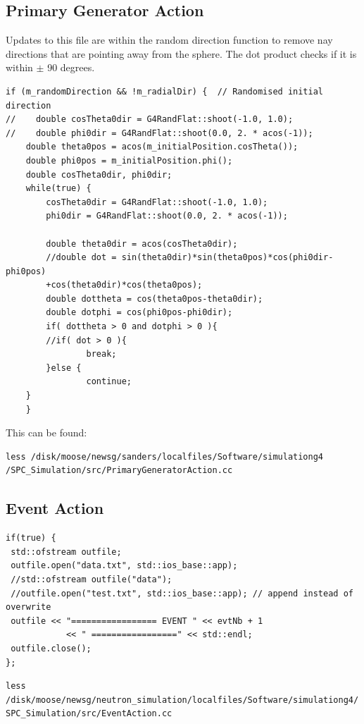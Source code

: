 \documentclass[a4paper]{article}
\begin{document}
\subsection{Primary Generator Action}
Updates to this file are within the random direction function to remove nay directions that are pointing away from the sphere. The dot product checks if it is within $\pm$ 90 degrees.
\begin{verbatim}
if (m_randomDirection && !m_radialDir) {  // Randomised initial direction
//    double cosTheta0dir = G4RandFlat::shoot(-1.0, 1.0);
//    double phi0dir = G4RandFlat::shoot(0.0, 2. * acos(-1));
    double theta0pos = acos(m_initialPosition.cosTheta());
    double phi0pos = m_initialPosition.phi();
    double cosTheta0dir, phi0dir;
    while(true) {
        cosTheta0dir = G4RandFlat::shoot(-1.0, 1.0);
        phi0dir = G4RandFlat::shoot(0.0, 2. * acos(-1));

        double theta0dir = acos(cosTheta0dir);
        //double dot = sin(theta0dir)*sin(theta0pos)*cos(phi0dir-phi0pos)
        +cos(theta0dir)*cos(theta0pos);
        double dottheta = cos(theta0pos-theta0dir);
        double dotphi = cos(phi0pos-phi0dir);
        if( dottheta > 0 and dotphi > 0 ){
        //if( dot > 0 ){
                break;
        }else {
                continue;
    }
    }
\end{verbatim}
This can be found:
\begin{verbatim}
less /disk/moose/newsg/sanders/localfiles/Software/simulationg4
/SPC_Simulation/src/PrimaryGeneratorAction.cc
\end{verbatim}
\subsection{Event Action}
\begin{verbatim}
if(true) {
 std::ofstream outfile;
 outfile.open("data.txt", std::ios_base::app);
 //std::ofstream outfile("data");
 //outfile.open("test.txt", std::ios_base::app); // append instead of overwrite
 outfile << "================= EVENT " << evtNb + 1
            << " =================" << std::endl;
 outfile.close();
};

\end{verbatim}
\begin{verbatim}
less /disk/moose/newsg/neutron_simulation/localfiles/Software/simulationg4/
SPC_Simulation/src/EventAction.cc
\end{verbatim}
\end{document}
